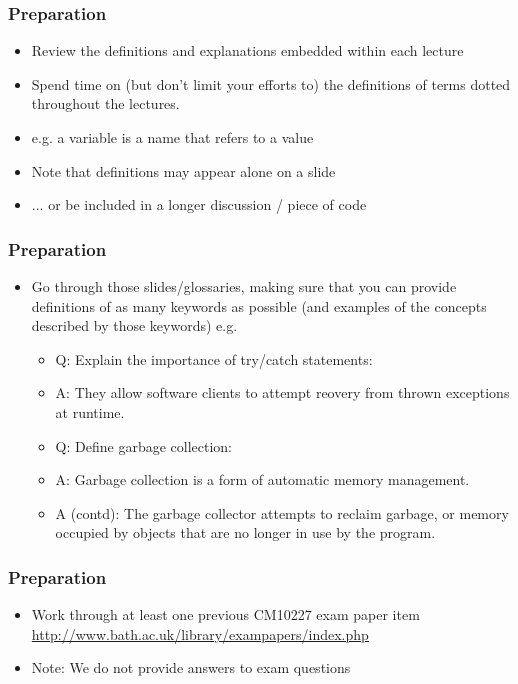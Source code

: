 \documentclass{beamer}
\begin{document}
\begin{frame}
\frametitle{Preparation}
\begin{itemize}
\item Review the definitions and explanations embedded within each lecture
\item Spend time on (but don't limit your efforts to) the definitions of terms dotted throughout the lectures.
\item e.g. a variable is a name that refers to a value
\bigskip
\item Note that definitions may appear alone on a slide 
\item ... or be included in a longer discussion / piece of code
\end{itemize}
\end{frame}

\begin{frame}
\frametitle{Preparation}
\begin{itemize}
\item Go through those slides/glossaries, making sure that you can provide definitions of as many keywords as possible (and examples of the concepts described by those keywords) e.g.
\begin{itemize}
\bigskip
\item Q: Explain the importance of try/catch statements:
\item A: They allow software clients to attempt reovery from thrown exceptions at runtime.
\bigskip
\item Q: Define garbage collection: 
\item A: Garbage collection is a form of automatic memory management.
\item A (contd): The garbage collector attempts to reclaim garbage, or memory occupied by objects that are no longer in use by the program.
\end{itemize}
\end{itemize}
\end{frame}

\begin{frame}
\frametitle{Preparation}
\begin{itemize}
\item Work through at least one previous CM10227 exam paper
item \url{http://www.bath.ac.uk/library/exampapers/index.php}
\item Note: We do not provide answers to exam questions
\end{itemize}
\end{frame}
\end{document}
